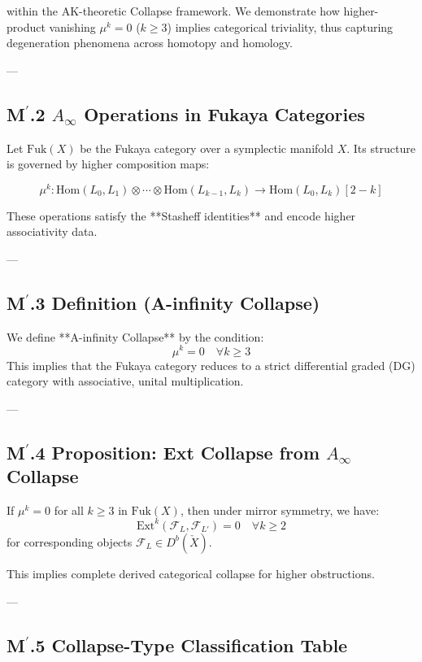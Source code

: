 \documentclass[11pt]{article}
\begin{document}
\begin{axiom}
\begin{axiom}
{{within the AK-theoretic Collapse framework. We demonstrate how higher-product vanishing $\mu^k = 0$ ($k \geq 3$)  
implies categorical triviality, thus capturing degeneration phenomena across homotopy and homology.

---

\subsection*{M$^\prime$.2 $A_\infty$ Operations in Fukaya Categories}

Let \( \mathrm{Fuk}(X) \) be the Fukaya category over a symplectic manifold \( X \).  
Its structure is governed by higher composition maps:

\[
\mu^k : \mathrm{Hom}(L_0, L_1) \otimes \cdots \otimes \mathrm{Hom}(L_{k-1}, L_k) \longrightarrow \mathrm{Hom}(L_0, L_k)[2-k]
\]

These operations satisfy the **Stasheff identities** and encode higher associativity data.

---

\subsection*{M$^\prime$.3 Definition (A-infinity Collapse)}

We define **A-infinity Collapse** by the condition:
\[
\mu^k = 0 \quad \forall k \geq 3
\]
This implies that the Fukaya category reduces to a strict differential graded (DG) category  
with associative, unital multiplication.

---

\subsection*{M$^\prime$.4 Proposition: Ext Collapse from $A_\infty$ Collapse}

\begin{proposition}
If \( \mu^k = 0 \) for all \( k \geq 3 \) in \( \mathrm{Fuk}(X) \),  
then under mirror symmetry, we have:
\[
\mathrm{Ext}^k(\mathcal{F}_L, \mathcal{F}_{L'}) = 0 \quad \forall k \geq 2
\]
for corresponding objects \( \mathcal{F}_L \in D^b(\check{X}) \).
\end{proposition}

This implies complete derived categorical collapse for higher obstructions.

---

\subsection*{M$^\prime$.5 Collapse-Type Classification Table}

}}
\end{axiom}
\end{axiom}
\end{document}
